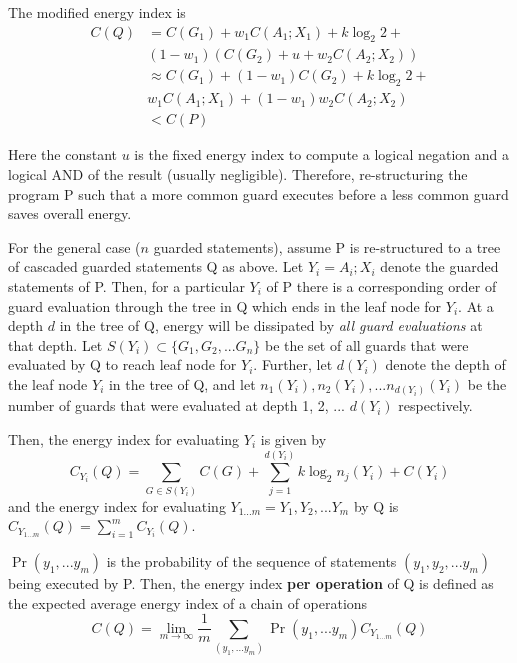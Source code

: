 The modified energy index is 
\begin{equation}
\begin{split}
	C(Q) &= C(G_1) + w_1 C(A_1; X_1) + k \log_2{2} +\\
		& (1 - w_1) (C(G_2) + u + w_2 C(A_2; X_2)) \\
		&\approx C(G_1) + (1 - w_1) C(G_2) + k \log_2{2} + \\
		& w_1 C(A_1; X_1) + (1 - w_1) w_2 C(A_2; X_2)\\
		&< C(P)
\end{split}
\end{equation}

Here the constant $u$ is the fixed energy index to compute a logical
negation and a logical AND of the result (usually negligible). 
Therefore, re-structuring the program P such that a more common
guard executes before a less common guard saves overall energy.

For the general case ($n$ guarded statements), assume 
P is re-structured to a tree of cascaded guarded statements Q as above. 
Let $Y_i = A_i; X_i$ denote the guarded statements of P.
Then, for a particular $Y_i$ of P there is a corresponding order of guard
evaluation through the tree in Q which ends in the leaf node for $Y_i$.
At a depth $d$ in the tree of Q, energy will be dissipated by \emph{all guard
evaluations} at that depth. Let $S(Y_i) \subset \{G_1, G_2, ... G_n\}$ be the set
of all guards that were evaluated by Q to reach leaf node for $Y_i$. Further,
let $d(Y_i)$ denote the depth of the leaf node $Y_i$ in the tree of Q, and let
$n_1(Y_i), n_2(Y_i), ... n_{d(Y_i)}(Y_i)$ be the number of guards that were
evaluated at depth 1, 2, ... $d(Y_i)$ respectively.

Then, the energy index for evaluating $Y_i$ is given by
\begin{equation}
	C_{Y_i}(Q) = \sum_{G \in S(Y_i)} C(G) + \sum_{j = 1}^{d(Y_i)} k 
	\log_2{n_j(Y_i)} + C(Y_i)
\end{equation}
and the energy index for evaluating $Y_{1...m} = Y_1, Y_2, ... Y_m$ by Q is
$C_{Y_{1...m}}(Q) = \sum_{i = 1}^{m} C_{Y_i}(Q)$. 

\begin{defn}
	$\Pr(y_1,...y_m)$ is the probability of the sequence of statements $(y_1, y_2, ...y_m)$ 
	being executed by P. 
	Then, the energy index \textbf{per operation} of Q is defined as the expected average
	energy index of a chain of operations 
	\begin{equation}
		C(Q) = \lim_{m \to \infty} \frac{1}{m} \sum_{(y_1,...y_m)} \Pr(y_1,...y_m) C_{Y_{1...m}}(Q)
	\end{equation}
\end{defn}

